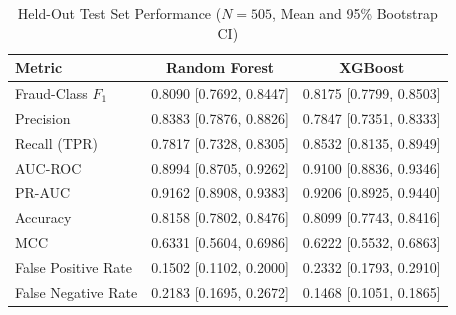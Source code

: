\begin{table}[!htbp]
\centering
\caption{Held-Out Test Set Performance ($N=505$, Mean and 95\% Bootstrap CI)}
\label{tab:test_metrics}
\footnotesize
\begin{tabularx}{\linewidth}{X c c}
\toprule
\textbf{Metric} & \textbf{Random Forest} & \textbf{XGBoost} \\
\midrule
Fraud-Class $F_1$ & 0.8090 [0.7692, 0.8447] & 0.8175 [0.7799, 0.8503] \\
Precision & 0.8383 [0.7876, 0.8826] & 0.7847 [0.7351, 0.8333] \\
Recall (TPR) & 0.7817 [0.7328, 0.8305] & 0.8532 [0.8135, 0.8949] \\
AUC-ROC & 0.8994 [0.8705, 0.9262] & 0.9100 [0.8836, 0.9346] \\
PR-AUC & 0.9162 [0.8908, 0.9383] & 0.9206 [0.8925, 0.9440] \\
Accuracy & 0.8158 [0.7802, 0.8476] & 0.8099 [0.7743, 0.8416] \\
MCC & 0.6331 [0.5604, 0.6986] & 0.6222 [0.5532, 0.6863] \\
False Positive Rate & 0.1502 [0.1102, 0.2000] & 0.2332 [0.1793, 0.2910] \\
False Negative Rate & 0.2183 [0.1695, 0.2672] & 0.1468 [0.1051, 0.1865] \\
\bottomrule
\end{tabularx}
\end{table}